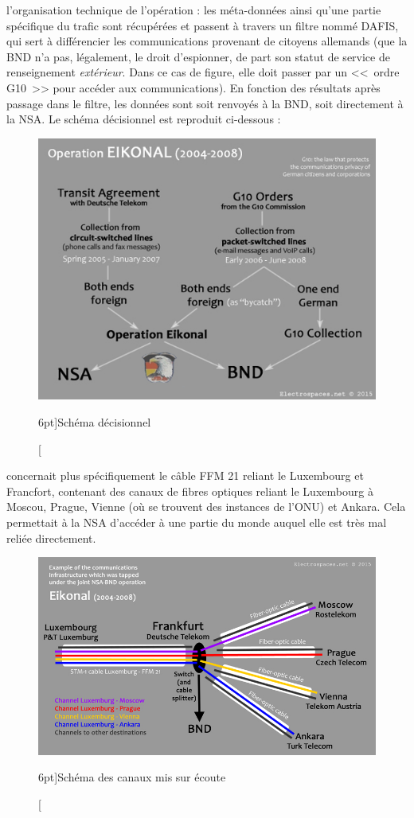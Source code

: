  l'organisation technique de l'opération : les
méta-données ainsi qu'une partie spécifique du trafic sont récupérées et passent
à travers un filtre nommé DAFIS\label{dafis}, qui sert à différencier les
communications provenant de citoyens allemands (que la BND n'a pas, légalement, le droit
d'espionner, de part son statut de service de renseignement \emph{extérieur}.
Dans ce cas de figure, elle doit passer par un <<~ordre G10~>> pour accéder
aux communications).
En fonction des résultats après passage dans le filtre, les données sont soit
renvoyés à la BND, soit directement à la NSA. Le schéma décisionnel est
reproduit ci-dessous :

\begin{figure}
\includegraphics{eikonal2.jpg}
\caption[Schéma décisionnel de l'opération EIKONAL][6pt]{Schéma décisionnel}
\label{fig:eikonal2}
\end{figure}

 concernait plus spécifiquement le câble FFM 21
reliant le Luxembourg et Francfort, contenant des canaux de fibres optiques
reliant le Luxembourg à Moscou, Prague, Vienne (où se trouvent des instances de
l'ONU) et Ankara\autocite{eikonal3}. Cela permettait à la NSA d'accéder à une partie du
monde auquel elle est très mal reliée directement.

\begin{figure}[!h]
\includegraphics{eikonal3.jpg}
\caption[Schéma des canaux mis sur écoute][6pt]{Schéma des canaux mis sur
écoute}
\label{fig:eikonal3}
\end{figure}

